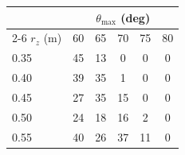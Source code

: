 \begin{tabular}{@{}lccccc@{}}
\toprule
 & \multicolumn{5}{c}{$\theta_{\max}$ (deg)} \\
\cmidrule(l){2-6}
$r_z$ (m) & 60 & 65 & 70 & 75 & 80 \\
\midrule
0.35 & 45 & 13 & 0 & 0 & 0 \\
0.40 & 39 & 35 & 1 & 0 & 0 \\
0.45 & 27 & 35 & 15 & 0 & 0 \\
0.50 & 24 & 18 & 16 & 2 & 0 \\
0.55 & 40 & 26 & 37 & 11 & 0 \\
\bottomrule
\end{tabular}
